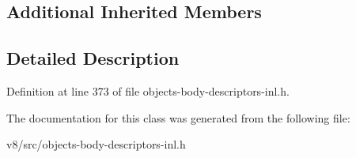 \subsection*{Additional Inherited Members}


\subsection{Detailed Description}


Definition at line 373 of file objects-\/body-\/descriptors-\/inl.\+h.



The documentation for this class was generated from the following file\+:\begin{DoxyCompactItemize}
\item 
v8/src/objects-\/body-\/descriptors-\/inl.\+h\end{DoxyCompactItemize}
